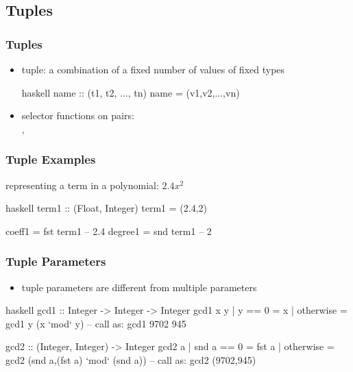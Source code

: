 \documentclass[dvipsnames]{beamer}
\theoremstyle{plain}
\begin{document}
\subsection{Tuples}

\begin{frame}[fragile]
  \frametitle{Tuples}

  \begin{itemize}
    \item \alert{tuple}: a combination of a fixed number of values
      of fixed types
    \begin{block}{}
      \begin{pygments}{haskell}
name :: (t1, t2, ..., tn)
name = (v1,v2,...,vn)
      \end{pygments}
    \end{block}

    \medskip
    \item selector functions on pairs:\\
      , 
  \end{itemize}
\end{frame}

\begin{frame}[fragile]
  \frametitle{Tuple Examples}

  \begin{exampleblock}{representing a term in a polynomial: $2.4x^2$}
    \begin{pygments}{haskell}
term1 :: (Float, Integer)
term1 = (2.4,2)

coeff1 = fst term1     -- 2.4
degree1 = snd term1    -- 2
    \end{pygments}
  \end{exampleblock}
\end{frame}

\begin{frame}[fragile]
  \frametitle{Tuple Parameters}

  \begin{itemize}
    \item tuple parameters are different from multiple parameters
  \end{itemize}

  \begin{exampleblock}{}
    \begin{pygments}{haskell}
gcd1 :: Integer -> Integer -> Integer
gcd1 x y
  | y == 0    = x
  | otherwise = gcd1 y (x `mod` y)
-- call as: gcd1 9702 945

gcd2 :: (Integer, Integer) -> Integer
gcd2 a
  | snd a == 0 = fst a
  | otherwise  = gcd2 (snd a,(fst a) `mod` (snd a))
-- call as: gcd2 (9702,945)
    \end{pygments}
  \end{exampleblock}
\end{frame}
\end{document}
